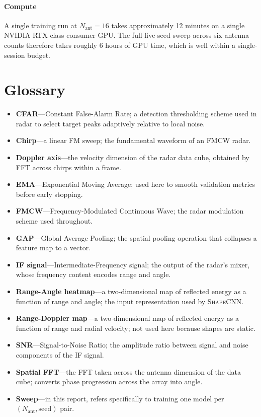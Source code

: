 \documentclass[letterpaper,11pt,leqno]{article}
\begin{document}
\paragraph{Compute} A single training run at $N_{\mathrm{ant}}=16$ takes approximately 12 minutes on a single NVIDIA RTX-class consumer GPU. The full five-seed sweep across six antenna counts therefore takes roughly 6 hours of GPU time, which is well within a single-session budget.

\section{Glossary}\label{a:glossary}

\begin{itemize}
\item \textbf{CFAR}---Constant False-Alarm Rate; a detection thresholding scheme used in radar to select target peaks adaptively relative to local noise.
\item \textbf{Chirp}---a linear FM sweep; the fundamental waveform of an FMCW radar.
\item \textbf{Doppler axis}---the velocity dimension of the radar data cube, obtained by FFT across chirps within a frame.
\item \textbf{EMA}---Exponential Moving Average; used here to smooth validation metrics before early stopping.
\item \textbf{FMCW}---Frequency-Modulated Continuous Wave; the radar modulation scheme used throughout.
\item \textbf{GAP}---Global Average Pooling; the spatial pooling operation that collapses a feature map to a vector.
\item \textbf{IF signal}---Intermediate-Frequency signal; the output of the radar's mixer, whose frequency content encodes range and angle.
\item \textbf{Range-Angle heatmap}---a two-dimensional map of reflected energy as a function of range and angle; the input representation used by \textsc{ShapeCNN}.
\item \textbf{Range-Doppler map}---a two-dimensional map of reflected energy as a function of range and radial velocity; not used here because shapes are static.
\item \textbf{SNR}---Signal-to-Noise Ratio; the amplitude ratio between signal and noise components of the IF signal.
\item \textbf{Spatial FFT}---the FFT taken across the antenna dimension of the data cube; converts phase progression across the array into angle.
\item \textbf{Sweep}---in this report, refers specifically to training one model per $(N_{\mathrm{ant}},\mathrm{seed})$ pair.
\end{itemize}
\end{document}

